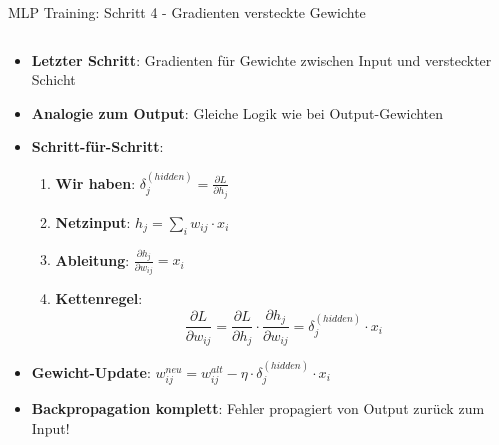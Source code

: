 \documentclass[aspectratio=1610, xcolor=dvipsnames, 9pt]{beamer}
\begin{document}
      \begin{frame}{MLP Training: Schritt 4 - Gradienten versteckte Gewichte}
        \begin{columns}
          \begin{column}{1\textwidth}
            \begin{itemize}
              \item \textbf{Letzter Schritt}: Gradienten für Gewichte zwischen Input und versteckter Schicht
              \item \textbf{Analogie zum Output}: Gleiche Logik wie bei Output-Gewichten
              \item \textbf{Schritt-für-Schritt}:
              \begin{enumerate}
                \item \textbf{Wir haben}: $\delta_j^{(hidden)} = \frac{\partial L}{\partial h_j}$
                \item \textbf{Netzinput}: $h_j = \sum_i w_{ij} \cdot x_i$
                \item \textbf{Ableitung}: $\frac{\partial h_j}{\partial w_{ij}} = x_i$
                \item \textbf{Kettenregel}:
                \begin{equation}
                  \frac{\partial L}{\partial w_{ij}} = \frac{\partial L}{\partial h_j} \cdot \frac{\partial h_j}{\partial w_{ij}} = \delta_j^{(hidden)} \cdot x_i
                \end{equation}
              \end{enumerate}
              \item \textbf{Gewicht-Update}: $w_{ij}^{neu} = w_{ij}^{alt} - \eta \cdot \delta_j^{(hidden)} \cdot x_i$
              \item \textbf{Backpropagation komplett}: Fehler propagiert von Output zurück zum Input!
            \end{itemize}
          \end{column}
        \end{columns}
      \end{frame}
\end{document}
